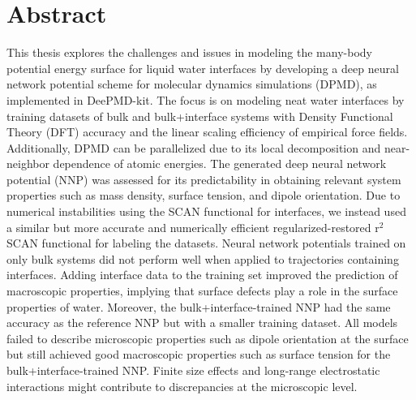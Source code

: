 \chapter*{Abstract}

This thesis explores the challenges and issues in modeling the many-body potential energy surface for liquid water interfaces by developing a deep neural network potential scheme for molecular dynamics simulations (DPMD), as implemented in DeePMD-kit. The focus is on modeling neat water interfaces by training datasets of bulk and bulk+interface systems with Density Functional Theory (DFT) accuracy and the linear scaling efficiency of empirical force fields. Additionally, DPMD can be parallelized due to its local decomposition and near-neighbor dependence of atomic energies. The generated deep neural network potential (NNP) was assessed for its predictability in obtaining relevant system properties such as mass density, surface tension, and dipole orientation. Due to numerical instabilities using the SCAN functional for interfaces, we instead used a similar but more accurate and numerically efficient regularized-restored r$^2$SCAN functional for labeling the datasets. Neural network potentials trained on only bulk systems did not perform well when applied to trajectories containing interfaces. Adding interface data to the training set improved the prediction of macroscopic properties, implying that surface defects play a role in the surface properties of water. Moreover, the bulk+interface-trained NNP had the same accuracy as the reference NNP but with a smaller training dataset. All models failed to describe microscopic properties such as dipole orientation at the surface but still achieved good macroscopic properties such as surface tension for the bulk+interface-trained NNP. Finite size effects and long-range electrostatic interactions might contribute to discrepancies at the microscopic level.